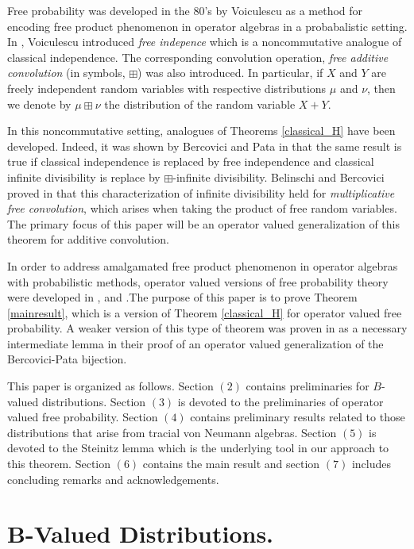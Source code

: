 \documentclass[11pt]{amsart}
\begin{document}
Free probability was developed in the 80's by Voiculescu as a method for encoding free product
phenomenon in operator algebras in a probabalistic setting.  In \cite{vo2}, Voiculescu introduced
\textit{free indepence} which is a noncommutative analogue of classical independence.  The corresponding 
convolution operation, \textit{free additive convolution} (in symbols, $\boxplus$) was also introduced.  In particular,
if $X$ and $Y$ are freely independent random variables with respective distributions $\mu$ and $\nu$, then we denote
by $\mu \boxplus \nu$ the distribution of the random variable $X + Y$.

In this noncommutative setting, analogues of Theorems \ref{classical_H} have been developed.  Indeed, it was shown by Bercovici
and Pata in \cite{Pata} that the same result is true if classical independence is replaced by free independence and classical
infinite divisibility is replace by $\boxplus$-infinite divisibility.  Belinschi and Bercovici proved in \cite{Bel} that this
characterization of infinite divisibility held for \textit{multiplicative free convolution}, which arises when taking
the product of free random variables.  The primary focus of this paper will be an operator valued generalization of this theorem
for additive convolution.

In order to address amalgamated free product phenomenon in operator algebras with probabilistic methods, operator valued 
versions of free probability theory were developed in \cite{vop}, \cite{vo5} and \cite{vo6}.The purpose of
this paper is to prove Theorem \ref{mainresult}, which is a version of Theorem \ref{classical_H} for operator
valued free probability.  A weaker version of this type of theorem was proven in \cite{PVB} as a necessary intermediate lemma
in their proof of an operator valued generalization of the Bercovici-Pata bijection.

This paper is organized as follows.  Section $(2)$ contains preliminaries for $B$-valued distributions.
Section $(3)$ is devoted to the preliminaries of operator valued free probability.  Section $(4)$ contains
preliminary results related to those distributions that arise from tracial von Neumann algebras.  Section $(5)$ is devoted
to the Steinitz lemma which is the underlying tool in our approach to this theorem.  Section $(6)$ contains the main result
and section $(7)$ includes concluding remarks and acknowledgements.

\section{B-Valued Distributions.}
\end{document}
